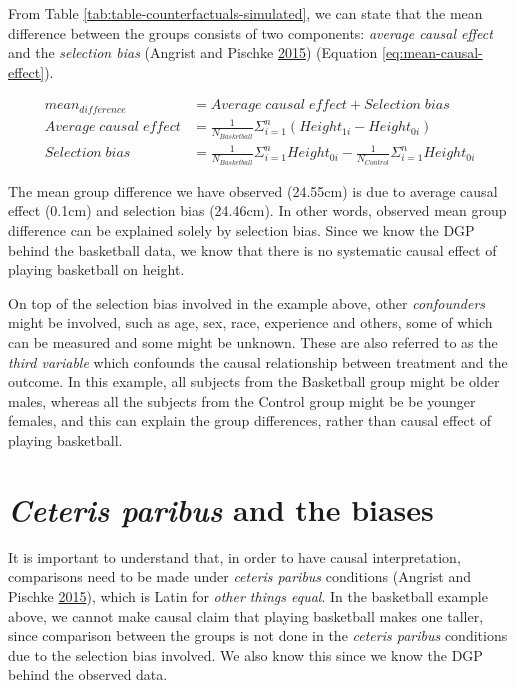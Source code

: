 \documentclass[
]{book}
\begin{document}
From Table \ref{tab:table-counterfactuals-simulated}, we can state that the mean difference between the groups consists of two components: \emph{average causal effect} and the \emph{selection bias} (Angrist and Pischke \protect\hyperlink{ref-angristMasteringMetricsPath2015}{2015}) (Equation \eqref{eq:mean-causal-effect}).

\begin{equation}
  \begin{split}
    mean_{difference} &= Average \; causal\; effect + Selection\; bias \\
    Average \; causal\; effect &= \frac{1}{N_{Basketball}}\Sigma_{i=1}^{n}(Height_{1i} - Height_{0i}) \\
    Selection\; bias &= \frac{1}{N_{Basketball}}\Sigma_{i=1}^{n}Height_{0i} - \frac{1}{N_{Control}}\Sigma_{i=1}^{n}Height_{0i}
  \end{split}
  \label{eq:mean-causal-effect}
\end{equation}

The mean group difference we have observed (24.55cm) is due to average causal effect (0.1cm) and selection bias (24.46cm). In other words, observed mean group difference can be explained solely by selection bias. Since we know the DGP behind the basketball data, we know that there is no systematic causal effect of playing basketball on height.

On top of the selection bias involved in the example above, other \emph{confounders} might be involved, such as age, sex, race, experience and others, some of which can be measured and some might be unknown. These are also referred to as the \emph{third variable} which confounds the causal relationship between treatment and the outcome. In this example, all subjects from the Basketball group might be older males, whereas all the subjects from the Control group might be be younger females, and this can explain the group differences, rather than causal effect of playing basketball.

\hypertarget{ceteris-paribus-and-the-biases}{%
\section{\texorpdfstring{\emph{Ceteris paribus} and the biases}{Ceteris paribus and the biases}}\label{ceteris-paribus-and-the-biases}}

It is important to understand that, in order to have causal interpretation, comparisons need to be made under \emph{ceteris paribus} conditions (Angrist and Pischke \protect\hyperlink{ref-angristMasteringMetricsPath2015}{2015}), which is Latin for \emph{other things equal}. In the basketball example above, we cannot make causal claim that playing basketball makes one taller, since comparison between the groups is not done in the \emph{ceteris paribus} conditions due to the selection bias involved. We also know this since we know the DGP behind the observed data.
\end{document}
